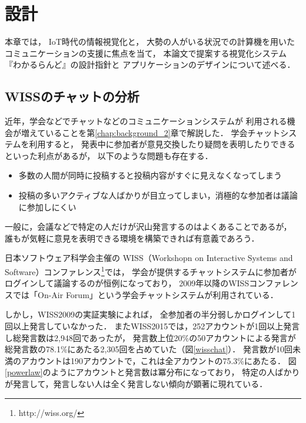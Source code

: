 \chapter{設計}
\label{chap:wakaruland}

本章では，
IoT時代の情報視覚化と，
大勢の人がいる状況での計算機を用いたコミュニケーションの支援に焦点を当て，
本論文で提案する視覚化システム『わかるらんど』の設計指針と
アプリケーションのデザインについて述べる．

\newpage

\section{WISSのチャットの分析}

近年，学会などでチャットなどのコミュニケーションシステムが
利用される機会が増えていることを第\ref{chap:background_2}章で解説した．
学会チャットシステムを利用すると，
発表中に参加者が意見交換したり疑問を表明したりできるといった利点があるが，
以下のような問題も存在する．

\begin{itemize}
\item 多数の人間が同時に投稿すると投稿内容がすぐに見えなくなってしまう
\item 投稿の多いアクティブな人ばかりが目立ってしまい，消極的な参加者は議論に参加しにくい
\end{itemize}

一般に，会議などで特定の人だけが沢山発言するのはよくあることであるが，
誰もが気軽に意見を表明できる環境を構築できれば有意義であろう．

日本ソフトウェア科学会主催の
WISS（Workshopn on Interactive Systems and Software）コンファレンス\footnote{\textsf{http://wiss.org/}}では，
学会が提供するチャットシステムに参加者がログインして議論するのが恒例になっており\cite{wiss_challenge}，
2009年以降のWISSコンファレンスでは「On-Air Forum」\cite{nishida2011}という学会チャットシステムが利用されている．

しかし，WISS2009の実証実験によれば，
全参加者の半分弱しかログインして1回以上発言していなかった．
またWISS2015では，252アカウントが1回以上発言し総発言数は2,948回であったが，
発言数上位20\%の50アカウントによる発言が
総発言数の78.1\%にあたる2,305回を占めていた（図\ref{wisschat}）．
発言数が10回未満のアカウントは190アカウントで，これは全アカウントの75.3\%にあたる．
図\ref{powerlaw}のようにアカウントと発言数は冪分布になっており，
特定の人ばかりが発言して，発言しない人は全く発言しない傾向が顕著に現れている．

